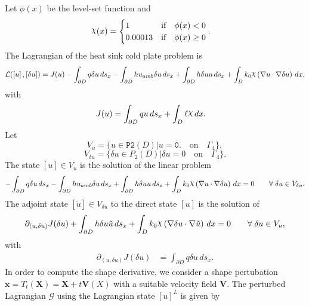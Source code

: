 \documentclass[preview]{standalone}
\let\oldcdot\cdot
\let\cdot\oldcdot
\begin{document}
Let $\phi(x)$ be the level-set function and
 \begin{align*}\raisebox{\depth}{$\chi$}(x) &= \begin{cases} 1 & \mbox{if}\quad \phi(x) < 0 \\ 0.00013 & \mbox{if}\quad \phi(x)  \ge 0 \end{cases}.\end{align*}
The Lagrangian of the heat sink cold plate problem is
\begin{dmath*}
\mathcal L(\left[ u\right],\left[ \delta u\right]) = J(u) -  \int_{\partial D} q \delta u \,ds_x -  \int_{\partial D} h u_{amb} \delta u \,ds_x +  \int_{\partial D} h \delta u u \,ds_x +  \int_{D} k_{0} \raisebox{\depth}{$\chi$} \left(  \nabla u  \cdot  \nabla \delta u  \right) \,dx , 
\end{dmath*}
with 
\begin{align*}
J(u) &=  \int_{\partial D} q u \,ds_x +  \int_{D} \ell \raisebox{\depth}{$\chi$} \,dx.
 \end{align*}
Let
\begin{equation*}
V_{u} = \{ u \in \mathtt{\text{P2}}(D)| u = \mathtt{\text{0.}}  \quad \text{{on}} \quad\Gamma_{4} \},\end{equation*}
\begin{equation*}
V_{\delta u} = \{ \delta u \in P_{2}(D)| \delta u = 0  \quad \text{{on}} \quad\Gamma_{4} \}.\end{equation*}
The state $\left[ u\right] \in  V_{u}$ is the solution of the linear problem
\begin{dmath*}
-  \int_{\partial D} q \delta u \,ds_x -  \int_{\partial D} h u_{amb} \delta u \,ds_x +  \int_{\partial D} h \delta u u \,ds_x +  \int_{D} k_{0} \raisebox{\depth}{$\chi$} \left(  \nabla u  \cdot  \nabla \delta u  \right) \,dx = 0\qquad \forall\; {\delta u\in V_{\delta u}} . 
\end{dmath*}
The adjoint state $\left[ \tilde u\right] \in  V_{\delta u}$ to the direct state $\left[ u\right]$ is the solution of
\begin{dmath*}
\partial_{(u,\delta u)} J(\delta u) +  \int_{\partial D} h \delta u \tilde u \,ds_x +  \int_{D} k_{0} \raisebox{\depth}{$\chi$} \left(  \nabla \delta u  \cdot  \nabla \tilde u  \right) \,dx = 0\qquad \forall\; {\delta u\in V_{u}} , 
\end{dmath*}
with 
\begin{align*}
\partial_{(u,\delta u)} J(\delta u) &=  \int_{\partial D} q \delta u \,ds_x.
 \end{align*}
In order to compute the shape derivative, we consider a shape pertubation $\mathbf x = T_t(\mathbf X) = \mathbf X + t \mathbf  V(X)$ with a suitable velocity field $\mathbf V$. The perturbed Lagrangian $\mathcal G$ using the Lagrangian state $\left[ u\right]^{L}$ is given by
\end{document}
